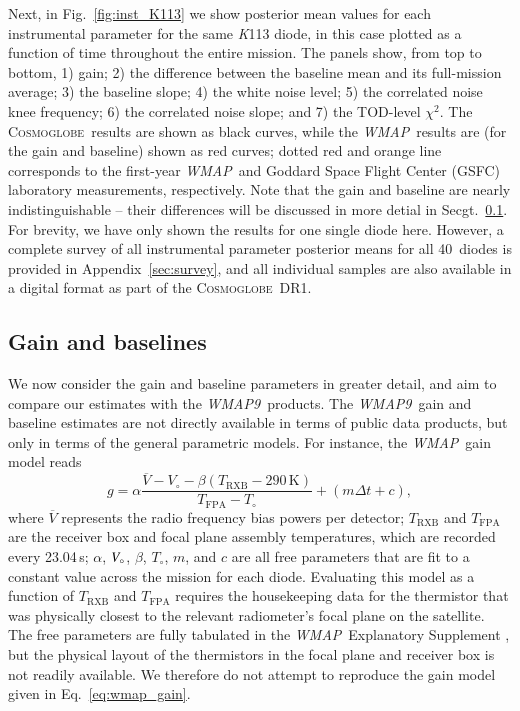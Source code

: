 \documentclass[twocolumn]{../../common/aa}
\def\WMAP{\emph{WMAP}}
\def\WMAPnine{\emph{WMAP9}}
\newcommand{\cosmoglobe}{\textsc{Cosmoglobe}}
\newcommand{\K}[0]{\textit K}
\newcommand{\V}[0]{\textit V}
\begin{document}
Next, in Fig.~\ref{fig:inst_K113} we show posterior mean values for each instrumental parameter for the same \K113 diode, in this case plotted as a function of time throughout the entire mission. The panels show, from top to bottom, 1) gain; 2) the difference between the baseline mean and its full-mission average; 3) the baseline slope; 4) the white noise level; 5) the correlated noise knee frequency; 6) the correlated noise slope; and 7) the TOD-level $\chi^2$. The \cosmoglobe\ results are shown as black curves, while the \WMAP\ results are (for the gain and baseline) shown as red curves; dotted red and orange line corresponds to the first-year \WMAP\ and Goddard Space Flight Center (GSFC) laboratory measurements, respectively. Note that the gain and baseline are nearly indistinguishable -- their differences will be discussed in more detial in Secgt.~\ref{sec:gain}. For brevity, we have only shown the results for one single diode here. However, a complete survey of all instrumental parameter posterior means for all 40~diodes is provided in Appendix~\ref{sec:survey}, and all individual samples are also available in a digital format as part of the \cosmoglobe\ DR1. 


\subsection{Gain and baselines}
\label{sec:gain}

We now consider the gain and baseline parameters in greater detail, and aim to compare our estimates with the \WMAPnine\ products. The \WMAPnine\ gain and baseline estimates are not directly available in terms of public data products, but only in terms of the general parametric models. For instance, the \WMAP\ gain model reads \citep{wmapexsupp}
\begin{equation}
	\label{eq:wmap_gain}
	g=\alpha\frac{\overline V-V_\circ-\beta(T_\mathrm{RXB}-290\,\mathrm K)}
	{T_\mathrm{FPA}-T_\circ}+(m\Delta t+c),
\end{equation}
where $\overline V$ represents the radio frequency bias powers per detector; $T_\mathrm{RXB}$ and $T_\mathrm{FPA}$ are the receiver box and focal plane assembly temperatures, which are recorded every 23.04\,s; $\alpha$, $\V_\circ$, $\beta$, $T_\circ$, $m$, and $c$ are all free parameters that are fit to a constant value across the mission for each diode. Evaluating this model as a function of $T_\mathrm{RXB}$ and $T_\mathrm{FPA}$ requires the housekeeping data for the thermistor that was physically closest to the relevant radiometer's focal plane on the satellite. The free parameters are fully tabulated in the \WMAP\ Explanatory Supplement \citep{wmapexsupp}, but the physical layout of the thermistors in the focal plane and receiver box is not readily available. We therefore do not attempt to reproduce the gain model given in Eq.~\eqref{eq:wmap_gain}.
\end{document}

